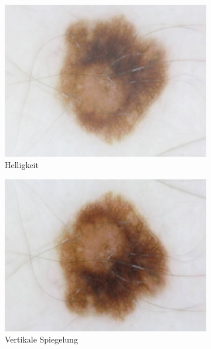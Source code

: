 \begin{figure}[t]
\begin{subfigure}{0.24\linewidth}
		\includegraphics[width=\textwidth]{./pics/augmentations/brightness.png}
		\caption{Helligkeit}
		\label{subfig:aug_bright}
	\end{subfigure}
	\begin{subfigure}{0.24\linewidth}
		\includegraphics[width=\textwidth]{./pics/augmentations/vertical_flip.png}
		\caption{Vertikale Spiegelung}
		\label{subfig:aug_v_flip}
	\end{subfigure}
	\begin{subfigure}[t]{0.24\linewidth}

\end{subfigure}
\end{figure}
